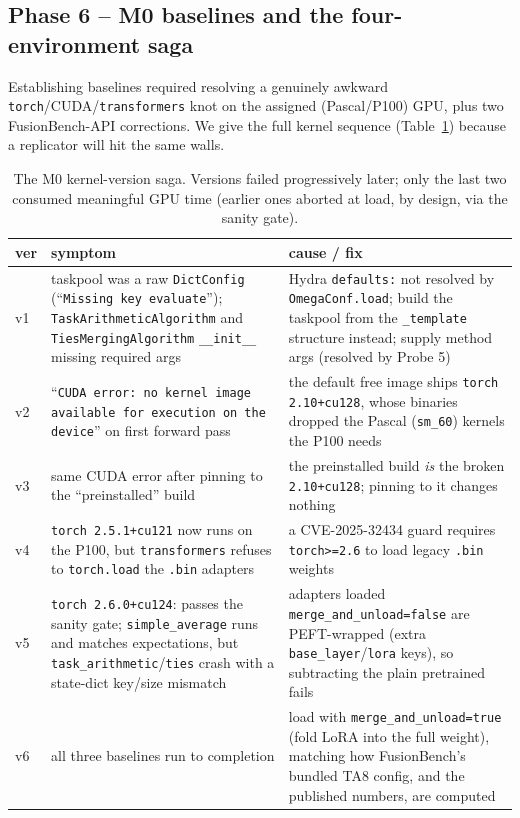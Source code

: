 \subsection{Phase 6 -- M0 baselines and the four-environment saga}
\label{app:m0saga}
Establishing baselines required resolving a genuinely awkward \texttt{torch}/CUDA/\texttt{transformers}
knot on the assigned (Pascal/P100) GPU, plus two FusionBench-API corrections. We give the full kernel
sequence (Table~\ref{tab:m0saga}) because a replicator will hit the same walls.

\begin{table}[h]
\centering
\caption{The M0 kernel-version saga. Versions failed progressively later; only the last two consumed
meaningful GPU time (earlier ones aborted at load, by design, via the sanity gate).}
\label{tab:m0saga}
\small
\begin{tabular}{p{0.6cm} p{6.3cm} p{7.4cm}}
\toprule
ver & symptom & cause / fix \\
\midrule
v1 & taskpool was a raw \texttt{DictConfig} (``\texttt{Missing key evaluate}''); \texttt{TaskArithmeticAlgorithm}
and \texttt{TiesMergingAlgorithm} \texttt{\_\_init\_\_} missing required args & Hydra \texttt{defaults:}
not resolved by \texttt{OmegaConf.load}; build the taskpool from the \texttt{\_template} structure
instead; supply method args (resolved by Probe 5) \\
v2 & ``\texttt{CUDA error: no kernel image available for execution on the device}'' on first forward pass
& the default free image ships \texttt{torch 2.10+cu128}, whose binaries dropped the Pascal
(\texttt{sm\_60}) kernels the P100 needs \\
v3 & same CUDA error after pinning to the ``preinstalled'' build & the preinstalled build \emph{is} the
broken \texttt{2.10+cu128}; pinning to it changes nothing \\
v4 & \texttt{torch 2.5.1+cu121} now runs on the P100, but \texttt{transformers} refuses to
\texttt{torch.load} the \texttt{.bin} adapters & a CVE-2025-32434 guard requires \texttt{torch>=2.6} to
load legacy \texttt{.bin} weights \\
v5 & \texttt{torch 2.6.0+cu124}: passes the sanity gate; \texttt{simple\_average} runs and matches
expectations, but \texttt{task\_arithmetic}/\texttt{ties} crash with a state-dict key/size mismatch &
adapters loaded \texttt{merge\_and\_unload=false} are PEFT-wrapped (extra \texttt{base\_layer}/\texttt{lora}
keys), so subtracting the plain pretrained fails \\
v6 & all three baselines run to completion & load with \texttt{merge\_and\_unload=true} (fold LoRA into
the full weight), matching how FusionBench's bundled TA8 config, and the published numbers, are computed \\
\bottomrule
\end{tabular}
\end{table}

